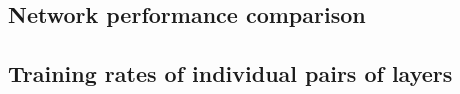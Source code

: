 \documentclass[utf8]{frontiersSCNS}
\begin{document}
\subsection{Network performance comparison}
\label{sec:network_performance}


\subsection{Training rates of individual pairs of layers}
\label{sec:mnist_perlayer}

%
\end{document}
